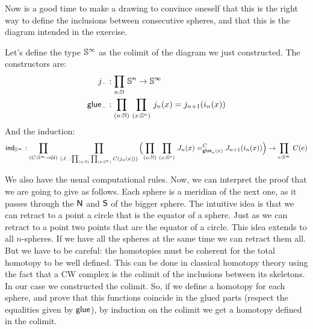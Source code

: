 \documentclass[
%
%
11pt %
]{article}
\begin{document}
Now is a good time to make a drawing to convince oneself that this is the
right way to define the inclusions between consecutive spheres, and that this
is the diagram intended in the exercise.

Let's define the type $\mathbb{S}^{\infty}$ as the colimit of the diagram we just
constructed. The constructors are:
\begin{align*}
  j_{\blank} &: \prd{n : \nat} \Sn^n \to \Sn^{\infty}\\
  \glue_{\blank} &: \prd{n : \nat}{x: \Sn^n} j_n(x) = j_{n+1}(i_n (x))
\end{align*}
And the induction:
\[
  \ind{\Sn^{\infty}} : \prd{C:\Sn^\infty \to \UU}{J_{\blank} : \prd{n : \nat}{x : \Sn^n} C(j_n(x))}
  \Parens{\prd{n:\nat}{x:\Sn^n} \dpath C {\glue_n(x)} {J_n(x)} {J_{n+1} (i_n (x))}}
  \to \prd{e:\Sn^{\infty}} C(e)
\]

We also have the usual computational rules.
Now, we can interpret the proof that we are going to give as follows.
Each sphere is a meridian of the next one, as it passes
through the $\mathsf{N}$ and $\mathsf{S}$ of the bigger sphere.
The intuitive idea is that we can retract to a point a circle that is the equator of a sphere.
Just as we can retract to a point two points that are the equator of a circle.
This idea extends to all $n$-spheres. If we have all the spheres at the same time
we can retract them all. But we have to be careful: the homotopies
must be coherent for the total homotopy to be well defined. This can be done in
classical homotopy theory using the fact that a CW complex is the colimit of
the inclusions between its skeletons. In our case we constructed the colimit.
So, if we define a homotopy for each sphere, and prove that this functions
coincide in the glued parts (respect the equalities given by $\mathsf{glue}$), by
induction on the colimit we get a homotopy defined in the colimit.
\end{document}
